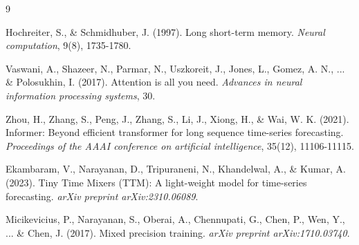 \documentclass[10pt,a4paper]{article}
\begin{document}
\begin{thebibliography}{9}

Hochreiter, S., \& Schmidhuber, J. (1997).
Long short-term memory.
\textit{Neural computation}, 9(8), 1735-1780.

Vaswani, A., Shazeer, N., Parmar, N., Uszkoreit, J., Jones, L., Gomez, A. N., ... \& Polosukhin, I. (2017).
Attention is all you need.
\textit{Advances in neural information processing systems}, 30.

Zhou, H., Zhang, S., Peng, J., Zhang, S., Li, J., Xiong, H., \& Wai, W. K. (2021).
Informer: Beyond efficient transformer for long sequence time-series forecasting.
\textit{Proceedings of the AAAI conference on artificial intelligence}, 35(12), 11106-11115.

Ekambaram, V., Narayanan, D., Tripuraneni, N., Khandelwal, A., \& Kumar, A. (2023).
Tiny Time Mixers (TTM): A light-weight model for time-series forecasting.
\textit{arXiv preprint arXiv:2310.06089}.

Micikevicius, P., Narayanan, S., Oberai, A., Chennupati, G., Chen, P., Wen, Y., ... \& Chen, J. (2017).
Mixed precision training.
\textit{arXiv preprint arXiv:1710.03740}.

\end{thebibliography}
\end{document}
